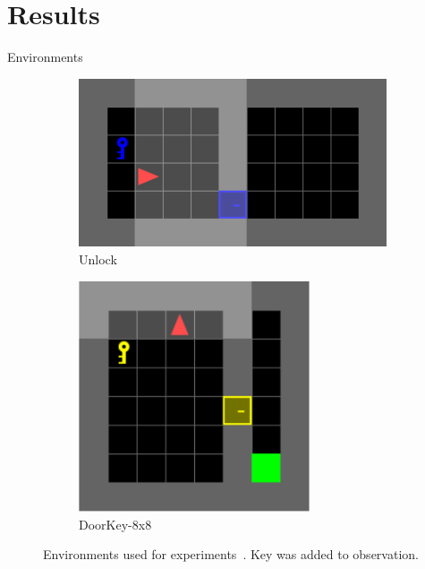 \documentclass[aspectratio=169]{beamer}
\begin{document}
\section{Results}
\begin{frame}{Environments}
  \begin{figure}
    \begin{subfigure}{0.48\textwidth}
      \centering
      \includegraphics[width=\textwidth, height=\textheight, keepaspectratio]{./images/unlock-v0.png}
      \caption{Unlock}
    \end{subfigure}
    \begin{subfigure}{0.48\textwidth}
      \centering
      \includegraphics[width=0.75\textwidth, height=\textheight, keepaspectratio]{./images/doorkey-8x8-v0.png}
      \caption{DoorKey-8x8}
    \end{subfigure}
    \caption{Environments used for experiments~\parencite{minigrid}. Key was added to observation.}
  \end{figure}
\end{frame}
\end{document}
